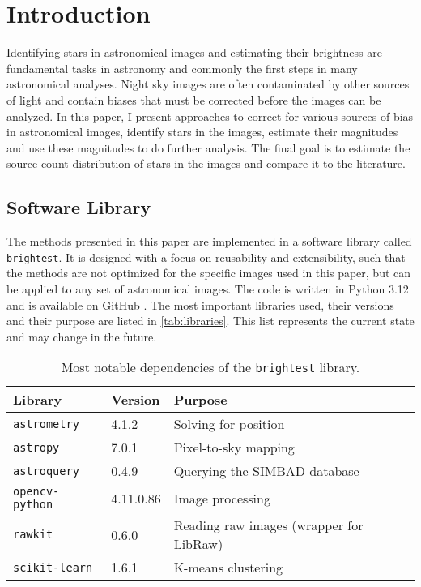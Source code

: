 \section{Introduction}
\label{sec:introduction}

Identifying stars in astronomical images and estimating their brightness are fundamental
tasks in astronomy and commonly the first steps in many astronomical analyses. Night sky
images are often contaminated by other sources of light and contain biases that must be
corrected before the images can be analyzed. In this paper, I present approaches to
correct for various sources of bias in astronomical images, identify stars in the images,
estimate their magnitudes and use these magnitudes to do further analysis. The final goal
is to estimate the source-count distribution of stars in the images and compare it to the
literature.

\subsection{Software Library}
\label{sec:software-library}

The methods presented in this paper are implemented in a software library called
\texttt{brightest}. It is designed with a focus on reusability and extensibility, such
that the methods are not optimized for the specific images used in this paper, but can be
applied to any set of astronomical images. The code is written in Python 3.12 and is
available \href{https://github.com/bischoff-m/brightest}{on GitHub} \cite{Bischoff2025}.
The most important libraries used, their versions and their purpose are listed in
\autoref{tab:libraries}. This list represents the current state and may change in the
future.

\begin{table}[htbp]
  \centering
  \begin{tabular}{lll}
    \toprule
    Library                                   & Version   & Purpose                                 \\
    \midrule
    \texttt{astrometry} \cite{astrometry2010} & 4.1.2     & Solving for position                    \\
    \texttt{astropy} \cite{astropy2022}       & 7.0.1     & Pixel-to-sky mapping                    \\
    \texttt{astroquery} \cite{astroquery2019} & 0.4.9     & Querying the SIMBAD database            \\
    \texttt{opencv-python} \cite{opencv2000}  & 4.11.0.86 & Image processing                        \\
    \texttt{rawkit} \cite{rawkit2025}         & 0.6.0     & Reading raw images (wrapper for LibRaw) \\
    \texttt{scikit-learn} \cite{scikit-learn} & 1.6.1     & K-means clustering                      \\
    \bottomrule
  \end{tabular}
  \caption{Most notable dependencies of the \texttt{brightest} library.}
  \label{tab:libraries}
\end{table}
